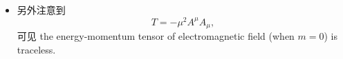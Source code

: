 \begin{itemize}
\begin{itemize}
		\begin{tcolorbox}[title=calculate:]
			在 Minkowski 时空中
			\begin{equation}
				\begin{dcases}
					\mathcal{L} = \frac{1}{2} (|\vec{E}|^2 - |\vec{B}|^2) + \frac{1}{2} \mu^2 (\phi^2 - |\vec{A}|^2) \\
					\tensor{F}{_0^\mu} F_{0 \mu} = - |\vec{E}|^2 \\
					\tensor{F}{_i^\mu} F_{0 \mu} = (\vec{E} \times \vec{B})_i \\
					\tensor{F}{_i^\mu} F_{j \mu} = E_i E_j - \delta^i_j |\vec{B}|^2 + B_i B_j
				\end{dcases}.
			\end{equation}
		\end{tcolorbox}
		
		\item 另外注意到
		\begin{equation}
			T = - \mu^2 A^\mu A_\mu,
		\end{equation}
		可见 the energy-momentum tensor of electromagnetic field (when $m = 0$) is traceless.
	\end{itemize}
\end{itemize}
